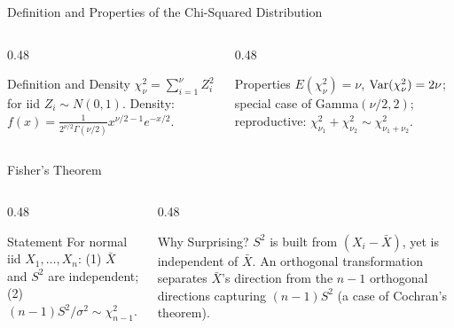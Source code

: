 \documentclass[aspectratio=169,xcolor={dvipsnames,table}]{beamer}
\begin{document}
\begin{frame}{Definition and Properties of the Chi-Squared Distribution}
	\vspace{-0.15cm}
	\begin{columns}[T]
		\begin{column}{0.48\textwidth}
			\begin{block}{Definition and Density}
				\footnotesize
				$\chi^2_\nu = \sum_{i=1}^\nu Z_i^2$ for iid $Z_i\sim N(0,1)$. Density: $f(x)=\frac{1}{2^{\nu/2}\Gamma(\nu/2)}x^{\nu/2-1}e^{-x/2}$.
			\end{block}
		\end{column}
		\begin{column}{0.48\textwidth}
			\begin{alertblock}{Properties}
				\footnotesize
				$E(\chi^2_\nu)=\nu$, $\operatorname{Var}(\chi^2_\nu)=2\nu$; special case of Gamma$(\nu/2,2)$; reproductive: $\chi^2_{\nu_1}+\chi^2_{\nu_2}\sim\chi^2_{\nu_1+\nu_2}$.
			\end{alertblock}
		\end{column}
	\end{columns}
\end{frame}

\begin{frame}{Fisher's Theorem}
	\vspace{-0.15cm}
	\begin{columns}[T]
		\begin{column}{0.48\textwidth}
			\begin{block}{Statement}
				\footnotesize
				For normal iid $X_1,\ldots,X_n$: (1) $\bar{X}$ and $S^2$ are independent; (2) $(n-1)S^2/\sigma^2 \sim \chi^2_{n-1}$.
			\end{block}
		\end{column}
		\begin{column}{0.48\textwidth}
			\begin{alertblock}{Why Surprising?}
				\footnotesize
				$S^2$ is built from $(X_i-\bar X)$, yet is independent of $\bar X$. An orthogonal transformation separates $\bar X$'s direction from the $n-1$ orthogonal directions capturing $(n-1)S^2$ (a case of Cochran's theorem).
			\end{alertblock}
		\end{column}
	\end{columns}
\end{frame}
\end{document}
